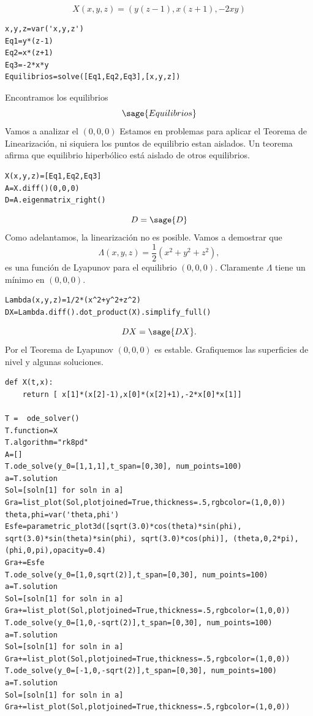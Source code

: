 \begin{ejemplo}{}\emph{\cite[ Ejemplo 6.1 ]{DavidBetounes488}}
\[X(x,y,z)=(y(z-1),x(z+1),-2xy)\]
\begin{lstlisting}
x,y,z=var('x,y,z')
Eq1=y*(z-1)
Eq2=x*(z+1)
Eq3=-2*x*y
Equilibrios=solve([Eq1,Eq2,Eq3],[x,y,z])
\end{lstlisting}
Encontramos los equilibrios
\[\sage{Equilibrios}\]
Vamos a analizar el $(0,0,0)$ Estamos en problemas para aplicar el Teorema de Linearización, ni siquiera los puntos de equilibrio estan aislados. Un teorema afirma que equilibrio hiperbólico está aislado de otros equilibrios.
\begin{lstlisting}
X(x,y,z)=[Eq1,Eq2,Eq3]
A=X.diff()(0,0,0)
D=A.eigenmatrix_right()
\end{lstlisting}
\[D=\sage{D}\]
Como adelantamos, la linearización no es posible. Vamos a demostrar que
\[\Lambda(x,y,z)=\frac12(x^2+y^2+z^2),\]
es una función de Lyapunov para el equilibrio $(0,0,0)$. Claramente $\Lambda$ tiene un mínimo en $(0,0,0)$. 
\begin{lstlisting}
Lambda(x,y,z)=1/2*(x^2+y^2+z^2)
DX=Lambda.diff().dot_product(X).simplify_full()
\end{lstlisting}
\[DX=\sage{DX}.\]
Por el Teorema de Lyapunov $(0,0,0)$ es estable. Grafiquemos las superficies de nivel y algunas soluciones.
\begin{lstlisting}
def X(t,x):
    return [ x[1]*(x[2]-1),x[0]*(x[2]+1),-2*x[0]*x[1]]

T =  ode_solver()
T.function=X
T.algorithm="rk8pd"
A=[]
T.ode_solve(y_0=[1,1,1],t_span=[0,30], num_points=100)
a=T.solution
Sol=[soln[1] for soln in a]
Gra=list_plot(Sol,plotjoined=True,thickness=.5,rgbcolor=(1,0,0))
theta,phi=var('theta,phi')
Esfe=parametric_plot3d([sqrt(3.0)*cos(theta)*sin(phi), sqrt(3.0)*sin(theta)*sin(phi), sqrt(3.0)*cos(phi)], (theta,0,2*pi), (phi,0,pi),opacity=0.4)
Gra+=Esfe
T.ode_solve(y_0=[1,0,sqrt(2)],t_span=[0,30], num_points=100)
a=T.solution
Sol=[soln[1] for soln in a]
Gra+=list_plot(Sol,plotjoined=True,thickness=.5,rgbcolor=(1,0,0))
T.ode_solve(y_0=[1,0,-sqrt(2)],t_span=[0,30], num_points=100)
a=T.solution
Sol=[soln[1] for soln in a]
Gra+=list_plot(Sol,plotjoined=True,thickness=.5,rgbcolor=(1,0,0))
T.ode_solve(y_0=[-1,0,-sqrt(2)],t_span=[0,30], num_points=100)
a=T.solution
Sol=[soln[1] for soln in a]
Gra+=list_plot(Sol,plotjoined=True,thickness=.5,rgbcolor=(1,0,0))
\end{lstlisting}
\begin{center}
\end{center}



\end{ejemplo}



